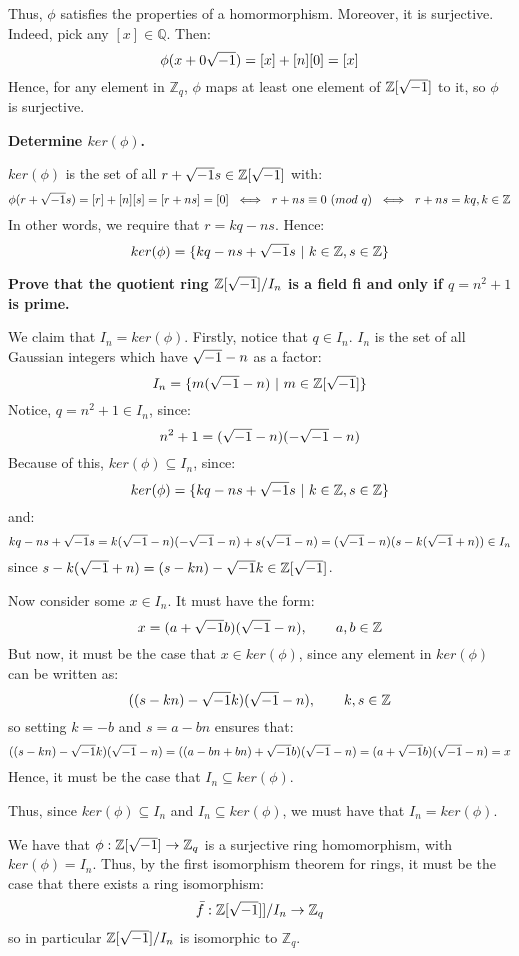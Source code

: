 \documentclass{exam}
\begin{document}
\begin{questions}
\smallskip

Thus, $\phi$ satisfies the properties of a homormorphism. Moreover, it is surjective. Indeed, pick any $[x] \in \mathbb{Q}$. Then:
\[
\phi(x + 0\sqrt{-1}) = [x] + [n][0] = [x]
\]
Hence, for any element in $\mathbb{Z}_q$, $\phi$ maps at least one element of $\mathbb{Z}[\sqrt{-1}]$ to it, so $\phi$ is surjective. 

\question \textbf{Determine $ker(\phi)$.}

$ker(\phi)$ is the set of all $r + \sqrt{-1} s \in \mathbb{Z}[\sqrt{-1}]$ with:
\[
\phi(r + \i s) = [r] + [n][s] = [r + ns] = [0] \ \iff \ r + ns \equiv 0 \ (mod \ q) \ \iff \ r + ns = kq, k \in \mathbb{Z}
\]
In other words, we require that $r = kq - ns$. Hence:
\[
ker(\phi) = \{kq - ns + \sqrt{-1} s \ | \ k \in \mathbb{Z}, s \in \mathbb{Z}\}
\]

\question \textbf{Prove that the quotient ring $\mathbb{Z}[\sqrt{-1}]/I_n$ is a field fi and only if $q = n^2 + 1$ is prime.}

We claim that $I_n = ker(\phi)$. Firstly, notice that $q \in I_n$. $I_n$ is the set of all Gaussian integers which have $\sqrt{-1} - n$ as a factor:
\[
I_n = \{m(\sqrt{-1} - n) \ | \ m \in \mathbb{Z}[\sqrt{-1}]\}
\]
Notice, $q = n^2 + 1 \in I_n$, since:
\[
n^2 + 1 = (\sqrt{-1} -n)(-\sqrt{-1}-n)
\]
Because of this, $ker(\phi) \subseteq I_n$, since:
\[
ker(\phi) = \{kq - ns + \sqrt{-1} s \ | \ k \in \mathbb{Z}, s \in \mathbb{Z}\}
\]
and:
\[
kq - ns + \sqrt{-1} s = k(\sqrt{-1} -n)(-\sqrt{-1}-n) + s(\sqrt{-1} -n) = (\sqrt{-1} - n)(s - k(\sqrt{-1} + n)) \in I_n
\]
since $s - k(\sqrt{-1} + n) = (s-kn) - \sqrt{-1} k \in \mathbb{Z}[\sqrt{-1}]$.

\smallskip

Now consider some $x \in I_n$. It must have the form:
\[
x = (a + \sqrt{-1} b)(\sqrt{-1} - n), \qquad a,b \in \mathbb{Z}
\]
But now, it must be the case that $x \in ker(\phi)$, since any element in $ker(\phi)$ can be written as:
\[
((s-kn) - \sqrt{-1} k)(\sqrt{-1} - n), \qquad k,s \in \mathbb{Z}
\]
so setting $k = -b$ and $s = a - bn$ ensures that:
\[
((s-kn) - \sqrt{-1} k)(\sqrt{-1} - n) = ((a - bn + bn) + \sqrt{-1} b)(\sqrt{-1} - n) = (a + \sqrt{-1} b)(\sqrt{-1} - n) = x
\]
Hence, it must be the case that $I_n \subseteq ker(\phi)$.

\smallskip

Thus, since $ker(\phi) \subseteq I_n$ and $I_n \subseteq ker(\phi)$, we must have that $I_n = ker(\phi)$.

\smallskip

We have that $\phi : \mathbb{Z}[\sqrt{-1}] \to \mathbb{Z}_q$ is a surjective ring homomorphism, with $ker(\phi) = I_n$. Thus, by the first isomorphism theorem for rings, it must be the case that there exists a ring isomorphism:
\[
\bar{f} : \mathbb{Z}[\sqrt{-1}]]/I_n \to \mathbb{Z}_q
\]
so in particular $\mathbb{Z}[\sqrt{-1}]/I_n$ is isomorphic to $\mathbb{Z}_q$.


\end{questions}
\end{document}
